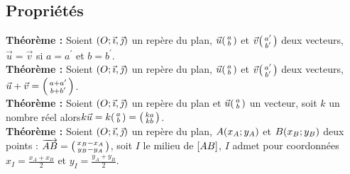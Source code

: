 \documentclass[a4paper,titlepage]{article}
\let\oldleft\left
\renewcommand{\left}{\mathopen{}\mathclose\bgroup\oldleft}
\let\oldright\right
\renewcommand{\right}{\aftergroup\egroup\oldright}
\begin{document}
    \subsection{Propriétés}
        \textbf{Théorème :} Soient $\left(O;\vec{\imath},\vec{\jmath}\right)$ un repère du plan, $\vec{u}\left(\begin{smallmatrix}a\\b\end{smallmatrix}\right)$ et $\vec{v}\left(\begin{smallmatrix}a^{\prime}\\b^{\prime}\end{smallmatrix}\right)$ deux vecteurs, $\vec{u}=\vec{v}$ si $a=a^{\prime}$ et $b=b^{\prime}$.
        \\
        \textbf{Théorème :} Soient $\left(O;\vec{\imath},\vec{\jmath}\right)$ un repère du plan, $\vec{u}\left(\begin{smallmatrix}a\\b\end{smallmatrix}\right)$ et $\vec{v}\left(\begin{smallmatrix}a^{\prime}\\b^{\prime}\end{smallmatrix}\right)$ deux vecteurs, $\vec{u}+\vec{v}=\left(\begin{smallmatrix}a+a^{\prime}\\b+b^{\prime}\end{smallmatrix}\right)$.
        \\
        \textbf{Théorème :} Soient $\left(O;\vec{\imath},\vec{\jmath}\right)$ un repère du plan et $\vec{u}\left(\begin{smallmatrix}a\\b\end{smallmatrix}\right)$ un vecteur, soit $k$ un nombre réel alors\linebreak$k\vec{u}=k\left(\begin{smallmatrix}a\\b\end{smallmatrix}\right)=\left(\begin{smallmatrix}ka\\kb\end{smallmatrix}\right)$.
        \\
        \textbf{Théorème :} Soient $\left(O;\vec{\imath},\vec{\jmath}\right)$ un repère du plan, $A\left(x_{A};y_{A}\right)$ et $B\left(x_{B};y_{B}\right)$ deux points : $\overrightarrow{AB}=\left(\begin{smallmatrix}x_{B}-x_{A}\\y_{B}-y_{A}\end{smallmatrix}\right)$, soit $I$ le milieu de $\left[AB\right]$, $I$ admet pour coordonnées $x_{I}=\frac{x_{A}+x_{B}}{2}$ et $y_{I}=\frac{y_{A}+y_{B}}{2}$.
\end{document}

